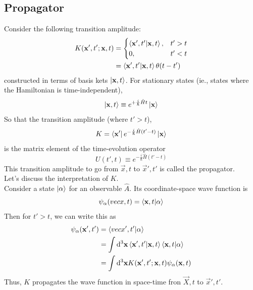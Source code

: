 \documentclass[a4paper]{article}
\begin{document}
\subsection{Propagator}
Consider the following transition amplitude:
\begin{align*}
	K(\boldsymbol{\mathbf{x}}',t';\boldsymbol{\mathbf{x}},t) &=
	\begin{cases}
		\left\langle \boldsymbol{\mathbf{x}}',t'\middle\vert \boldsymbol{\mathbf{x}},t \right\rangle, & t'>t\\
		0, & t'<t
	\end{cases}\\
	&= \left\langle \boldsymbol{\mathbf{x}}',t'\middle\vert \boldsymbol{\mathbf{x}},t \right\rangle\theta(t-t')
\end{align*}
constructed in terms of basis kets $\left\lvert \boldsymbol{\mathbf{x}},t\right\rangle$. For stationary states
(ie., states where the Hamiltonian is time-independent),
\[
	\left\lvert \boldsymbol{\mathbf{x}},t\right\rangle \equiv e^{+\frac{i}{\hslash}\hat{H}t}\left\lvert \boldsymbol{\mathbf{x}}\right\rangle
\]
So that the transition amplitude (where $t'>t$),
\[
	K = \left\langle \boldsymbol{\mathbf{x}}' \right\rvert e^{-\frac{i}{\hslash}\hat{H}(t'-t)}\left\lvert \boldsymbol{\mathbf{x}}\right\rangle
\]
is the matrix element of the time-evolution operator
\[
	U(t',t) \equiv e^{-\frac{i}{\hslash}\hat{H}(t'-t)}
\]
This transition amplitude to go from $\vec{x},t$ to $\vec{x}',t'$ is called the
propagator.\\
Let's discuss the interpretation of $K$.\\
Consider a state $\left\lvert \alpha\right\rangle$ for an observable $\hat{A}$. Its
coordinate-space wave function is
\[
	\psi_\alpha(vec{x},t) = \left\langle \boldsymbol{\mathbf{x}},t\middle\vert \alpha \right\rangle
\]
Then for $t'>t$, we can write this as
\begin{align*}
	\psi_\alpha(\boldsymbol{\mathbf{x}}',t') &= \left\langle vec{x}',t'\middle\vert \alpha \right\rangle\\
	&= \int\mathrm{d}^3\boldsymbol{\mathbf{x}} \left\langle \boldsymbol{\mathbf{x}}',t'\middle\vert \boldsymbol{\mathbf{x}},t \right\rangle
	\left\langle \boldsymbol{\mathbf{x}},t\middle\vert \alpha \right\rangle\\
	&= \int\mathrm{d}^3\boldsymbol{\mathbf{x}} K(\boldsymbol{\mathbf{x}}',t';\boldsymbol{\mathbf{x}},t) \psi_\alpha(\boldsymbol{\mathbf{x}},t)
\end{align*}
Thus, $K$ propagates the wave function in space-time fron $\vec{X},t$ to
$\vec{x}',t'$.
\end{document}
